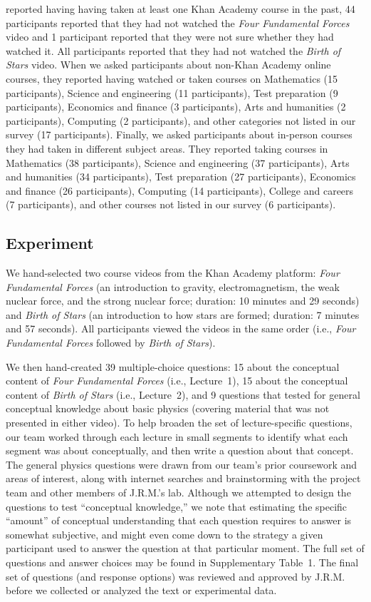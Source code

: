 \documentclass[10pt]{article}
\newcommand{\questions}{1}
\begin{document}
reported having having taken at least one Khan Academy course in the past, 44
participants reported that they had not watched the \textit{Four Fundamental
Forces} video and 1 participant reported that they were not sure whether they
had watched it. All participants reported that they had not watched the
\textit{Birth of Stars} video. When we asked participants about non-Khan
Academy online courses, they reported having watched or taken courses on
Mathematics (15 participants), Science and engineering (11 participants), Test
preparation (9 participants), Economics and finance (3 participants), Arts and
humanities (2 participants), Computing (2 participants), and other categories
not listed in our survey (17 participants). Finally, we asked participants
about in-person courses they had taken in different subject areas. They
reported taking courses in Mathematics (38 participants), Science and
engineering (37 participants), Arts and humanities (34 participants), Test
preparation (27 participants), Economics and finance (26 participants),
Computing (14 participants), College and careers (7 participants), and other
courses not listed in our survey (6 participants).


\subsection*{Experiment}\label{subsec:experiment}

We hand-selected two course videos from the Khan Academy platform: \textit{Four
Fundamental Forces} (an introduction to gravity, electromagnetism, the weak
nuclear force, and the strong nuclear force; duration: 10 minutes and 29
seconds) and \textit{Birth of Stars} (an introduction to how stars are formed;
duration: 7 minutes and 57 seconds). All participants viewed the videos in the
same order (i.e., \textit{Four Fundamental Forces} followed by \textit{Birth of
Stars}).

We then hand-created 39 multiple-choice questions: 15 about the conceptual
content of \textit{Four Fundamental Forces} (i.e., Lecture~1), 15 about the
conceptual content of \textit{Birth of Stars} (i.e., Lecture~2), and 9
questions that tested for general conceptual knowledge about basic physics
(covering material that was not presented in either video). To help broaden the
set of lecture-specific questions, our team worked through each lecture in
small segments to identify what each segment was about conceptually, and
then write a question about that concept. The general physics questions were
drawn from our team's prior coursework and areas of interest, along with internet
searches and brainstorming with the project team and other members of J.R.M.'s
lab. Although we attempted to design the questions to test ``conceptual
knowledge,'' we note that estimating the specific ``amount'' of conceptual
understanding that each question requires to answer is somewhat subjective,
and might even come down to the strategy a given participant used to answer
the question at that particular moment. The full set of questions and answer
choices may be found in Supplementary Table~\questions.  The final set of
questions (and response options) was reviewed and approved by J.R.M. before we
collected or analyzed the text or experimental data.
\end{document}
